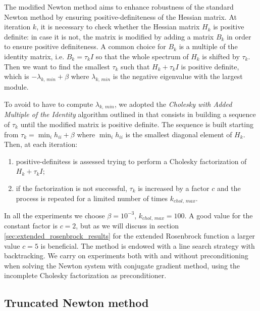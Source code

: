 The modified Newton method aims to enhance robustness of the standard Newton method by ensuring positive-definiteness of the Hessian matrix.
At iteration $k$, it is necessary to check whether the Hessian matrix $H_k$ is positive definite: in case it is not, the matrix is modified by adding a matrix $B_k$ in order to ensure positive definiteness.
A common choice for $B_k$ is a multiple of the identity matrix, i.e. $B_k = \tau_k I$ so that the whole spectrum of $H_k$ is shifted by $\tau_k$.
Then we want to find the smallest $\tau_k$ such that $H_k + \tau_k I$ is positive definite, which is $-\lambda_{k,\,min} + \beta$ where $\lambda_{k,\,min}$ is the negative eigenvalue with the largest module.

To avoid to have to compute $\lambda_{k,\,min}$, we adopted the \textit{Cholesky with Added Multiple of the Identity} algorithm outlined in \cite{nocedal-optimization} that consists in building a sequence of $\tau_k$ until the modified matrix is positive definite.
The sequence is built starting from $\tau_k = \min_i h_{ii} + \beta$ where $\min_i h_{ii}$ is the smallest diagonal element of $H_k$.
Then, at each iteration:
\begin{enumerate}
\item positive-definitess is assessed trying to perform a Cholesky factorization of $H_k + \tau_k I$;
\item if the factorization is not successful, $\tau_k$ is increased by a factor $c$ and the process is repeated for a limited number of times $k_{chol,\,max}$.
\end{enumerate}
In all the experiments we choose $\beta = 10^{-3}$, $k_{chol,\,max} = 100$.
A good value for the constant factor is $c=2$, but as we will discuss in section \ref{sec:extended_rosenbrock_results} for the extended Rosenbrock function a larger value $c=5$ is beneficial.
The method is endowed with a line search strategy with backtracking.
We carry on experiments both with and without preconditioning when solving the Newton system with conjugate gradient method, using the incomplete Cholesky factorization as preconditioner.

\subsection{Truncated Newton method}

